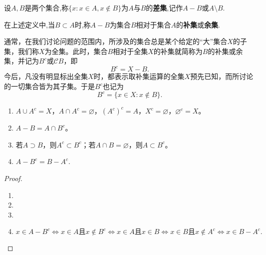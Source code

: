 \documentclass[../../main.tex]{subfiles}
\begin{document}
\begin{definition}
设$A,B$是两个集合,称$\{x:x\in A,x\notin B\}$为$A$与$B$的\textbf{差集},记作$A-B$或$A\setminus B$.

在上述定义中,当$B\subset A$时,称$A-B$为集合$B$相对于集合$A$的\textbf{补集}或\textbf{余集}.

通常，在我们讨论问题的范围内，所涉及的集合总是某个给定的“大”集合\(X\)的子集，我们称\(X\)为全集。此时，集合\(B\)相对于全集\(X\)的补集就简称为\(B\)的补集或余集，并记为\(B^c\)或\(\mathscr{C} B\)，即
\[B^c = X- B.\]
今后，凡没有明显标出全集\(X\)时，都表示取补集运算的全集\(X\)预先已知，而所讨论的一切集合皆为其子集。于是\(B^c\)也记为
\[B^c = \{x\in X:x\notin B\}.\]
\end{definition}

\begin{proposition}[集合的差与补的基本性质]\label{proposition:集合的差与补的基本性质}
\begin{enumerate}[(1)]
\item \(A\cup A^c = X\)，\(A\cap A^c = \varnothing\)，\((A^c)^c = A\)，\(X^c = \varnothing\)，\(\varnothing^c = X\)。

\item\(A- B = A\cap B^c\)。

\item 若\(A\supset B\)，则\(A^c\subset B^c\)；若\(A\cap B = \varnothing\)，则\(A\subset B^c\)。

\item $A-B^c=B-A^c$.
\end{enumerate}
\end{proposition}
\begin{proof}
\begin{enumerate}[(1)]
\item 

\item 

\item 

\item $x\in A-B^c\Longleftrightarrow x\in A\text{且}x\notin B^c\Longleftrightarrow x\in A\text{且}x\in B
\Longleftrightarrow x\in B\text{且}x\notin A^c\Longleftrightarrow x\in B-A^c.$
\end{enumerate}

\end{proof}
\end{document}
